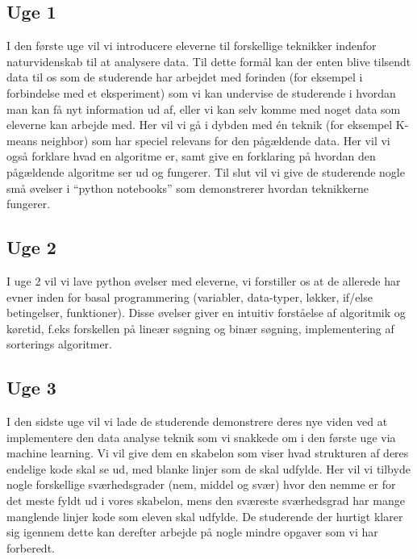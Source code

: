 \documentclass[11pt]{article}
\begin{document}
    \subsection*{Uge 1}
        I den første uge vil vi introducere eleverne til forskellige teknikker
        indenfor naturvidenskab til at analysere data. Til dette formål kan der
        enten blive tilsendt data til os som de studerende har arbejdet med
        forinden (for eksempel i forbindelse med et eksperiment) som vi kan
        undervise de studerende i hvordan man kan få nyt information ud af,
        eller vi kan selv komme med noget data som eleverne kan arbejde med.
        Her vil vi gå i dybden med én teknik (for eksempel K-means neighbor)
        som har speciel relevans for den pågældende data. Her vil vi også
        forklare hvad en algoritme er, samt give en forklaring på hvordan den
        pågældende algoritme ser ud og fungerer. Til slut vil vi give de
        studerende nogle små øvelser i ``python notebooks'' som demonstrerer
        hvordan teknikkerne fungerer.

    \subsection*{Uge 2}
        I uge 2 vil vi lave python øvelser med eleverne, vi forstiller os at de
        allerede har evner inden for basal programmering
        (variabler, data-typer, løkker, if/else betingelser, funktioner).
        Disse øvelser giver en intuitiv forståelse af algoritmik og køretid, f.eks
        forskellen på lineær søgning og binær søgning, implementering af
        sorterings algoritmer.

    \subsection{Uge 3}
        I den sidste uge vil vi lade de studerende demonstrere deres nye
        viden ved at implementere den data analyse teknik som vi snakkede
        om i den første uge via machine learning. Vi vil give dem en skabelon
        som viser hvad strukturen af deres endelige kode skal se ud, med
        blanke linjer som de skal udfylde. Her vil vi tilbyde nogle forskellige
        sværhedsgrader (nem, middel og svær) hvor den nemme er for det
        meste fyldt ud i vores skabelon, mens den sværeste sværhedsgrad
        har mange manglende linjer kode som eleven skal udfylde. De
        studerende der hurtigt klarer sig igennem dette kan derefter arbejde
        på nogle mindre opgaver som vi har forberedt.
\end{document}
